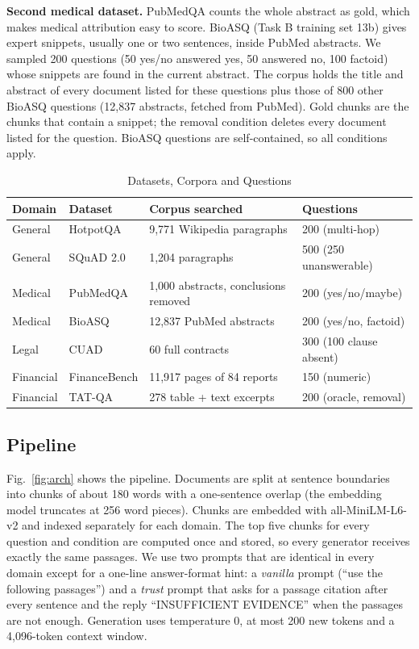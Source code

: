 \documentclass[conference]{IEEEtran}
\begin{document}
\textbf{Second medical dataset.} PubMedQA counts the whole abstract as gold, which makes medical attribution easy to score. BioASQ
\cite{krithara2023bioasq} (Task B training set 13b) gives expert snippets, usually one or two sentences, inside PubMed abstracts. We sampled 200
questions (50 yes/no answered yes, 50 answered no, 100 factoid) whose snippets are found in the current abstract. The corpus holds the title and
abstract of every document listed for these questions plus those of 800 other BioASQ questions (12,837 abstracts, fetched from PubMed). Gold chunks are
the chunks that contain a snippet; the removal condition deletes every document listed for the question. BioASQ questions are self-contained, so all
conditions apply.

\begin{table}[!t]
\caption{Datasets, Corpora and Questions}
\label{tab:data}
\centering
\footnotesize
\begin{tabular}{@{}llp{2.1cm}p{1.8cm}@{}}
\toprule
Domain & Dataset & Corpus searched & Questions \\
\midrule
General & HotpotQA \cite{yang2018hotpotqa} & 9,771 Wikipedia paragraphs & 200 (multi-hop) \\
General & SQuAD 2.0 \cite{rajpurkar2018squad2} & 1,204 paragraphs & 500 (250 unanswerable) \\
Medical & PubMedQA \cite{jin2019pubmedqa} & 1,000 abstracts, conclusions removed & 200 (yes/no/maybe) \\
Medical & BioASQ \cite{krithara2023bioasq} & 12,837 PubMed abstracts & 200 (yes/no, factoid) \\
Legal & CUAD \cite{hendrycks2021cuad} & 60 full contracts & 300 (100 clause absent) \\
Financial & FinanceBench \cite{islam2023financebench} & 11,917 pages of 84 reports & 150 (numeric) \\
Financial & TAT-QA \cite{zhu2021tatqa} & 278 table + text excerpts & 200 (oracle, removal) \\
\bottomrule
\end{tabular}
\end{table}

\subsection{Pipeline}
Fig.~\ref{fig:arch} shows the pipeline. Documents are split at sentence boundaries into chunks of about 180 words with a one-sentence overlap (the
embedding model truncates at 256 word pieces). Chunks are embedded with all-MiniLM-L6-v2 \cite{reimers2019sbert,wang2020minilm} and indexed separately
for each domain. The top five chunks for every question and condition are computed once and stored, so every generator receives exactly the same
passages. We use two prompts that are identical in every domain except for a one-line answer-format hint: a \emph{vanilla} prompt (``use the following
passages'') and a \emph{trust} prompt that asks for a passage citation after every sentence and the reply ``INSUFFICIENT EVIDENCE'' when the passages
are not enough. Generation uses temperature 0, at most 200 new tokens and a 4,096-token context window.
\end{document}
